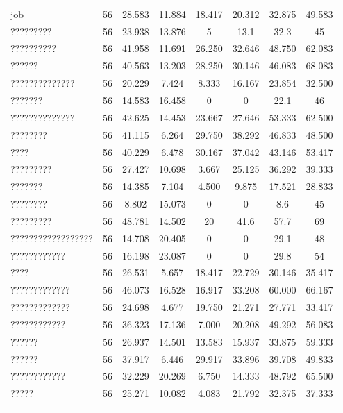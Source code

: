 \begin{table}[!htbp]
\begin{tabular}{@{\extracolsep{5pt}}lccccccc}
job & 56 & 28.583 & 11.884 & 18.417 & 20.312 & 32.875 & 49.583 \\ 
????????? & 56 & 23.938 & 13.876 & 5 & 13.1 & 32.3 & 45 \\ 
?????????? & 56 & 41.958 & 11.691 & 26.250 & 32.646 & 48.750 & 62.083 \\ 
?????? & 56 & 40.563 & 13.203 & 28.250 & 30.146 & 46.083 & 68.083 \\ 
?????????????? & 56 & 20.229 & 7.424 & 8.333 & 16.167 & 23.854 & 32.500 \\ 
??????? & 56 & 14.583 & 16.458 & 0 & 0 & 22.1 & 46 \\ 
?????????????? & 56 & 42.625 & 14.453 & 23.667 & 27.646 & 53.333 & 62.500 \\ 
???????? & 56 & 41.115 & 6.264 & 29.750 & 38.292 & 46.833 & 48.500 \\ 
???? & 56 & 40.229 & 6.478 & 30.167 & 37.042 & 43.146 & 53.417 \\ 
????????? & 56 & 27.427 & 10.698 & 3.667 & 25.125 & 36.292 & 39.333 \\ 
??????? & 56 & 14.385 & 7.104 & 4.500 & 9.875 & 17.521 & 28.833 \\ 
???????? & 56 & 8.802 & 15.073 & 0 & 0 & 8.6 & 45 \\ 
????????? & 56 & 48.781 & 14.502 & 20 & 41.6 & 57.7 & 69 \\ 
?????????????????? & 56 & 14.708 & 20.405 & 0 & 0 & 29.1 & 48 \\ 
???????????? & 56 & 16.198 & 23.087 & 0 & 0 & 29.8 & 54 \\ 
???? & 56 & 26.531 & 5.657 & 18.417 & 22.729 & 30.146 & 35.417 \\ 
????????????? & 56 & 46.073 & 16.528 & 16.917 & 33.208 & 60.000 & 66.167 \\ 
????????????? & 56 & 24.698 & 4.677 & 19.750 & 21.271 & 27.771 & 33.417 \\ 
???????????? & 56 & 36.323 & 17.136 & 7.000 & 20.208 & 49.292 & 56.083 \\ 
?????? & 56 & 26.937 & 14.501 & 13.583 & 15.937 & 33.875 & 59.333 \\ 
?????? & 56 & 37.917 & 6.446 & 29.917 & 33.896 & 39.708 & 49.833 \\ 
???????????? & 56 & 32.229 & 20.269 & 6.750 & 14.333 & 48.792 & 65.500 \\ 
????? & 56 & 25.271 & 10.082 & 4.083 & 21.792 & 32.375 & 37.333 \\ 
\hline \\[-1.8ex] 
\end{tabular} 
\end{table} 